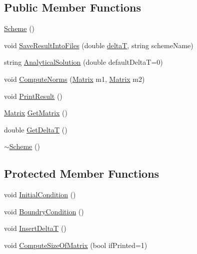 \subsection*{Public Member Functions}
\begin{DoxyCompactItemize}
\item 
\mbox{\hyperlink{class_scheme_aa0b319a6594176dea40ca78562401b53}{Scheme}} ()
\item 
void \mbox{\hyperlink{class_scheme_ae4512b4c8ead4d8ced95174f0b241f8a}{Save\+Result\+Into\+Files}} (double \mbox{\hyperlink{class_scheme_aaaf978f98d30bd96ea56a9387d1b2c5a}{deltaT}}, string scheme\+Name)
\item 
string \mbox{\hyperlink{class_scheme_a7d3e9f8133a955517471eb7a6fea355f}{Analytical\+Solution}} (double default\+DeltaT=0)
\item 
void \mbox{\hyperlink{class_scheme_ae098876d0287ac2bf5220608db2a8468}{Compute\+Norms}} (\mbox{\hyperlink{class_matrix}{Matrix}} m1, \mbox{\hyperlink{class_matrix}{Matrix}} m2)
\item 
void \mbox{\hyperlink{class_scheme_ae26048cf5128c6ea6e698a7036f2cc42}{Print\+Result}} ()
\item 
\mbox{\hyperlink{class_matrix}{Matrix}} \mbox{\hyperlink{class_scheme_a14c333d182a6b4e94aa2a346000257ea}{Get\+Matrix}} ()
\item 
double \mbox{\hyperlink{class_scheme_af05aa7671d5c080c0cca501cb6717cd0}{Get\+DeltaT}} ()
\item 
\mbox{\hyperlink{class_scheme_af8f283786d3b27d97c55d92b9ae8b20b}{$\sim$\+Scheme}} ()
\end{DoxyCompactItemize}
\subsection*{Protected Member Functions}
\begin{DoxyCompactItemize}
\item 
void \mbox{\hyperlink{class_scheme_ad3546cda995629a2792629a072760ad2}{Initial\+Condition}} ()
\item 
void \mbox{\hyperlink{class_scheme_a36885039937c25f13c8daea654e37b97}{Boundry\+Condition}} ()
\item 
void \mbox{\hyperlink{class_scheme_ac5803e4951dc125b274f543d5037c21d}{Insert\+DeltaT}} ()
\item 
void \mbox{\hyperlink{class_scheme_a0364e328d78e84be15d293a66d946008}{Compute\+Size\+Of\+Matrix}} (bool if\+Printed=1)
\end{DoxyCompactItemize}
